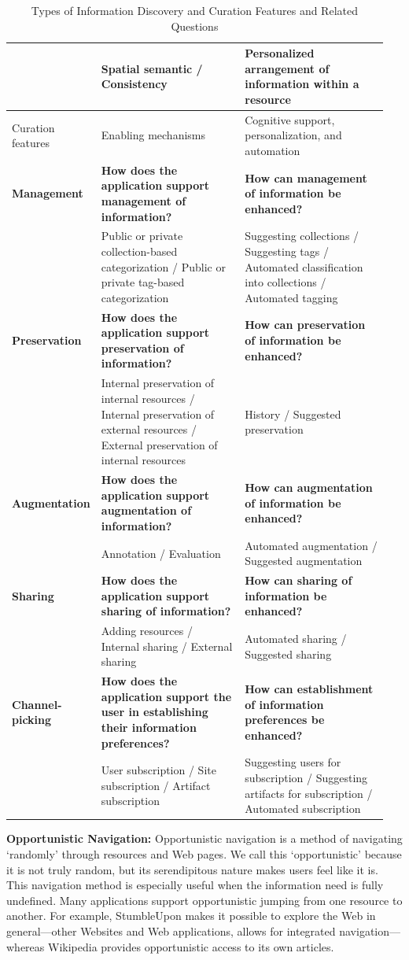 \documentclass{sigchi}
\newcommand{\feature}[1]{{\ttfamily#1}}
\begin{document}
{\begin{table}[!htb]
\begin{tabular}{|p{0.15\linewidth}| p{0.40\linewidth}| p{0.40\linewidth}|}
& Spatial semantic / Consistency & Personalized arrangement of information within a resource  \\ 
\hline
Curation features &Enabling mechanisms & Cognitive support, personalization, and automation \\
\hline
\textbf{Management} & \textbf{How does the application support management of information?} & \textbf{How can management of information be enhanced?}\\
& Public or private collection-based categorization / Public or private tag-based categorization & Suggesting collections / Suggesting tags / Automated classification into collections / Automated tagging \\
\textbf{Preservation} & \textbf{How does the application support preservation of information?} & \textbf{How can preservation of information be enhanced?}\\
& Internal preservation of internal resources / Internal preservation of external resources / External preservation of internal resources & History / Suggested preservation  \\
\textbf{Augmentation} & \textbf{How does the application support augmentation of information?} & \textbf{How can augmentation of information be enhanced?}\\
& Annotation / Evaluation & Automated augmentation / Suggested augmentation \\ 
\textbf{Sharing} & \textbf{How does the application support sharing of information?} & \textbf{How can sharing of information be enhanced?}\\
& Adding resources / Internal sharing / External sharing & Automated sharing / Suggested sharing \\
\textbf{Channel-picking}  	& \textbf{How does the application support the user in establishing their information preferences?} & \textbf{How can establishment of information preferences be enhanced?}\\
& User subscription / Site subscription / Artifact subscription & Suggesting users for subscription / Suggesting artifacts for subscription / Automated subscription \\     
\hline
\end{tabular}
\caption{Types of Information Discovery and Curation Features and Related Questions}
\label{table:framework} 
\end{table}

\textbf{Opportunistic Navigation:}
Opportunistic navigation is a method of navigating `randomly' through resources and Web pages. We call this `opportunistic' because it is not truly random, but its serendipitous nature makes users feel like it is. This navigation method is especially useful when the information need is fully undefined.
%
Many applications support opportunistic jumping from one resource to another. For example, StumbleUpon makes it possible to explore the Web in general---other Websites and Web applications, allows for \feature{integrated} navigation---whereas Wikipedia provides opportunistic access to its own articles. 


}
\end{document}
